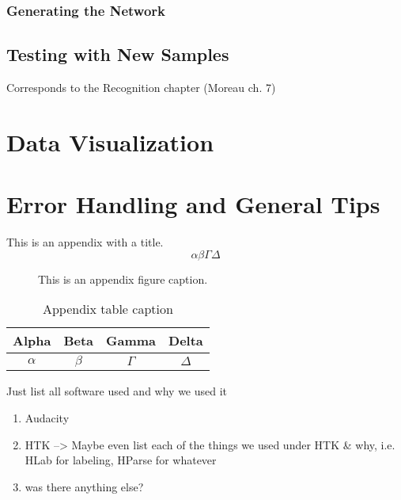 \documentclass{wileySev}
\begin{document}
\section{Generating the Network}

\chapter{Testing with New Samples}
Corresponds to the Recognition chapter (Moreau ch. 7)


\part{Data Visualization}

\part{Error Handling and General Tips}

This is an appendix with a title.
\begin{equation}
\alpha\beta\Gamma\Delta
\end{equation}



\begin{figure}[ht]
\caption{This is an appendix figure caption.}
\end{figure}


\begin{table}[ht]
\caption{Appendix table caption}
\centering
\begin{tabular}{cccc}
\hline
Alpha&Beta&Gamma&Delta\\
\hline
$\alpha$&$\beta$&$\Gamma$&$\Delta$\\
\hline
\end{tabular}
\end{table}

Just list all software used and why we used it
\begin{enumerate}
\item Audacity
\item HTK --> Maybe even list each of the things we used under HTK \& why, i.e. HLab for labeling, HParse for whatever
\item was there anything else?
\end{enumerate}
\end{document}
